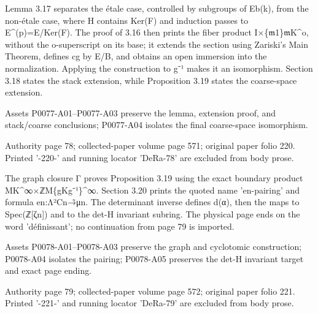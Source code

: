 \documentclass[11pt,a4paper]{article}
\begin{document}
Lemma 3.17 separates the étale case, controlled by subgroups of E\textunderscore{}b(k), from the non-étale case, where H contains Ker(F) and induction passes to E\textasciicircum{}(p)=E/Ker(F). The proof of 3.16 then prints the fiber product I×\textunderscore{}\{\ensuremath{\mathfrak{m}}\textunderscore{}1\}\ensuremath{\mathfrak{m}}\textunderscore{}K\textasciicircum{}o, without the o-superscript on its base; it extends the section using Zariski's Main Theorem, defines cg by E/B, and obtains an open immersion into the normalization. Applying the construction to g⁻¹ makes it an isomorphism. Section 3.18 states the stack extension, while Proposition 3.19 states the coarse-space extension.

Assets P0077-A01--P0077-A03 preserve the lemma, extension proof, and stack/coarse conclusions; P0077-A04 isolates the final coarse-space isomorphism.


\par\medskip
\hypertarget{D018-P0078}{}
\par\smallskip
Authority page 78; collected-paper volume page 571; original paper folio 220. Printed '-220-' and running locator 'DeRa-78' are excluded from body prose.

The graph closure Γ proves Proposition 3.19 using the exact boundary product M\textunderscore{}K\textasciicircum{}∞×\textunderscore{}ℤM\textunderscore{}\{gKg⁻¹\}\textasciicircum{}∞. Section 3.20 prints the quoted name 'e\textunderscore{}n-pairing' and formula e\textunderscore{}n:Λ²C\textunderscore{}n→̃μ\textunderscore{}n. The determinant inverse defines d(α), then the maps to Spec(ℤ[ζ\textunderscore{}n]) and to the det-H invariant subring. The physical page ends on the word 'définissant'; no continuation from page 79 is imported.

Assets P0078-A01--P0078-A03 preserve the graph and cyclotomic construction; P0078-A04 isolates the pairing; P0078-A05 preserves the det-H invariant target and exact page ending.


\par\medskip
\hypertarget{D018-P0079}{}
\par\smallskip
Authority page 79; collected-paper volume page 572; original paper folio 221. Printed '-221-' and running locator 'DeRa-79' are excluded from body prose.
\end{document}

